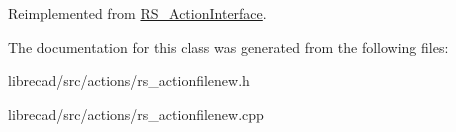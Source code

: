 Reimplemented from \hyperlink{classRS__ActionInterface_aa2ba8f6f697f735eace4ec5449c0b8cd}{R\-S\-\_\-\-Action\-Interface}.



The documentation for this class was generated from the following files\-:\begin{DoxyCompactItemize}
\item 
librecad/src/actions/rs\-\_\-actionfilenew.\-h\item 
librecad/src/actions/rs\-\_\-actionfilenew.\-cpp\end{DoxyCompactItemize}
